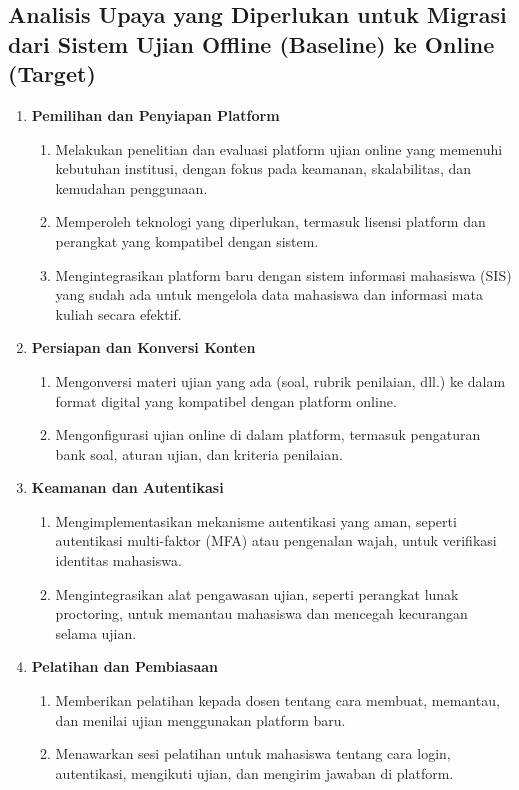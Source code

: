 \subsection{Analisis Upaya yang Diperlukan untuk Migrasi dari Sistem Ujian Offline (Baseline) ke Online (Target)}

\begin{enumerate}
	
	\item \textbf{Pemilihan dan Penyiapan Platform}
	\begin{enumerate}
		\item Melakukan penelitian dan evaluasi platform ujian online yang memenuhi kebutuhan institusi, dengan fokus pada keamanan, skalabilitas, dan kemudahan penggunaan.
		\item Memperoleh teknologi yang diperlukan, termasuk lisensi platform dan perangkat yang kompatibel dengan sistem.
		\item Mengintegrasikan platform baru dengan sistem informasi mahasiswa (SIS) yang sudah ada untuk mengelola data mahasiswa dan informasi mata kuliah secara efektif.
	\end{enumerate}
	
	\item \textbf{Persiapan dan Konversi Konten}
	\begin{enumerate}
		\item Mengonversi materi ujian yang ada (soal, rubrik penilaian, dll.) ke dalam format digital yang kompatibel dengan platform online.
		\item Mengonfigurasi ujian online di dalam platform, termasuk pengaturan bank soal, aturan ujian, dan kriteria penilaian.
	\end{enumerate}
	
	\item \textbf{Keamanan dan Autentikasi}
	\begin{enumerate}
		\item Mengimplementasikan mekanisme autentikasi yang aman, seperti autentikasi multi-faktor (MFA) atau pengenalan wajah, untuk verifikasi identitas mahasiswa.
		\item Mengintegrasikan alat pengawasan ujian, seperti perangkat lunak proctoring, untuk memantau mahasiswa dan mencegah kecurangan selama ujian.
	\end{enumerate}
	
	\item \textbf{Pelatihan dan Pembiasaan}
	\begin{enumerate}
		\item Memberikan pelatihan kepada dosen tentang cara membuat, memantau, dan menilai ujian menggunakan platform baru.
		\item Menawarkan sesi pelatihan untuk mahasiswa tentang cara login, autentikasi, mengikuti ujian, dan mengirim jawaban di platform.
	\end{enumerate}
	

\end{enumerate}
